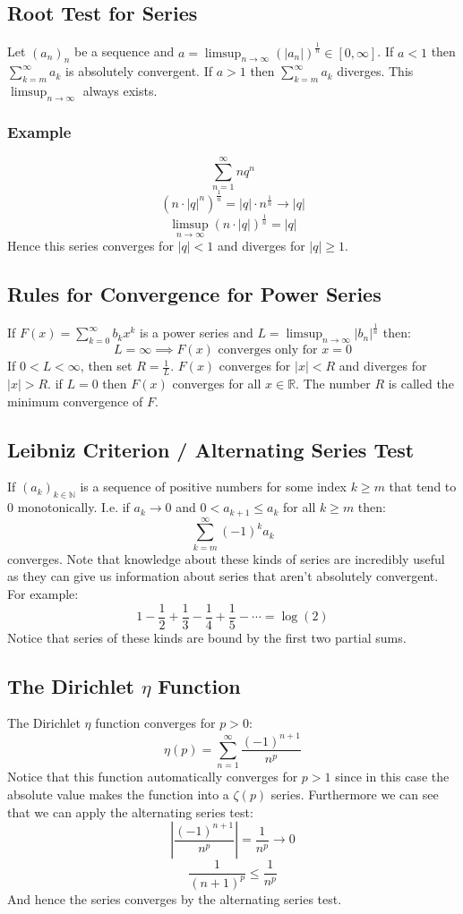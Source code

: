 \documentclass[12pt]{article}
\newcommand{\seq}[2]{(#1_#2)_{#2\in\mathbb{N}}}
\begin{document}
\subsection{Root Test for Series}
Let \((a_n)_n\) be a sequence and \(a=\limsup_{n\to\infty}(|a_n|)^{\frac{1}{n}}\in[0,\infty]\). If \(a<1\) then \(\sum^\infty_{k=m}a_k\) is absolutely convergent. If \(a>1\) then \(\sum^\infty_{k=m}a_k\) diverges. This \(\limsup_{n\to\infty}\) always exists.
\subsubsection*{Example}
\[\sum^\infty_{n=1}nq^n\]
\[(n\cdot|q|^n)^\frac{1}{n}=|q|\cdot n^\frac{1}{n}\to |q|\]
\[\limsup_{n\to\infty}(n\cdot|q|)^\frac{1}{n}=|q|\]
Hence this series converges for \(|q|<1\) and diverges for \(|q|\geq 1\). 
\subsection{Rules for Convergence for Power Series}
If \(F(x)=\sum^\infty_{k=0}b_kx^k\) is a power series and \(L=\limsup_{n\to\infty}|b_n|^\frac{1}{n}\) then:
\[L=\infty\implies F(x)\text{ converges only for }x=0\]
If \(0<L<\infty\), then set \(R=\frac{1}{L}\). \(F(x)\) converges for \(|x|<R\) and diverges for \(|x|>R\). if \(L=0\) then \(F(x)\) converges for all \(x\in\mathbb{R}\). The number \(R\) is called the minimum convergence of \(F\).
\subsection{Leibniz Criterion / Alternating Series Test}
If \(\seq{a}{k}\) is a sequence of positive numbers for some index \(k\geq m\) that tend to 0 monotonically. I.e. if \(a_k\to0\) and \(0<a_{k+1}\leq a_k\) for all \(k\geq m\) then:
\[\sum^\infty_{k=m}(-1)^ka_k\]
converges. Note that knowledge about these kinds of series are incredibly useful as they can give us information about series that aren't absolutely convergent. For example:
\[1-\frac{1}{2}+\frac{1}{3}-\frac{1}{4}+\frac{1}{5}-\cdots=\log(2)\]
Notice that series of these kinds are bound by the first two partial sums.
\subsection{The Dirichlet \(\eta\) Function}
The Dirichlet \(\eta\) function converges for \(p>0\):
\[\eta(p)=\sum^\infty_{n=1}\frac{(-1)^{n+1}}{n^p}\]
Notice that this function automatically converges for \(p>1\) since in this case the absolute value makes the function into a \(\zeta(p)\) series. Furthermore we can see that we can apply the alternating series test:
\[\left|\frac{(-1)^{n+1}}{n^p}\right|=\frac{1}{n^p}\to 0\]
\[\frac{1}{(n+1)^p}\leq \frac{1}{n^p}\]
And hence the series converges by the alternating series test.
\end{document}
